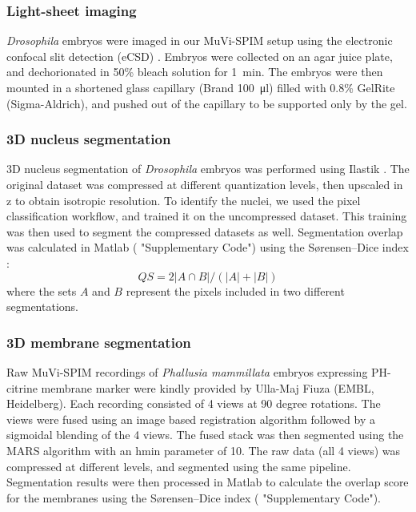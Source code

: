 \subsubsection{Light-sheet imaging}
\textit{Drosophila} embryos were imaged in our MuVi-SPIM setup \cite{krzic_multiview_2012} using the electronic confocal slit detection (eCSD) \cite{de_medeiros_confocal_2015}. Embryos were collected on an agar juice plate, and dechorionated in 50\% bleach solution for \SI{1}{min}. The embryos were then mounted in a shortened glass capillary (Brand \SI{100}{\micro l}) filled with 0.8\% GelRite (Sigma-Aldrich), and pushed out of the capillary to be supported only by the gel.

\subsubsection{3D nucleus segmentation}
3D nucleus segmentation of \textit{Drosophila} embryos was performed using Ilastik \cite{sommer_ilastik:_2011}. The original dataset was compressed at different quantization levels, then upscaled in z to obtain isotropic resolution. To identify the nuclei, we used the pixel classification workflow, and trained it on the uncompressed dataset. This training was then used to segment the compressed datasets as well. Segmentation overlap was calculated in Matlab ( "Supplementary Code") using the Sørensen–Dice index \cite{sorensen_method_1948,dice_measures_1945}:
\begin{equation}
  QS = 2 \left| A \cap B \right| / \left( |A| + |B| \right)
\end{equation}
where the sets $A$ and $B$ represent the pixels included in two different segmentations.

\subsubsection{3D membrane segmentation}
Raw MuVi-SPIM recordings of \textit{Phallusia mammillata} embryos expressing PH-citrine membrane marker were kindly provided by Ulla-Maj Fiuza (EMBL, Heidelberg). Each recording consisted of 4 views at 90 degree rotations. The views were fused using an image based registration algorithm followed by a sigmoidal blending of the 4 views. The fused stack was then segmented using the MARS algorithm \cite{fernandez_imaging_2010} with an hmin parameter of 10. The raw data (all 4 views) was compressed at different levels, and segmented using the same pipeline. Segmentation results were then processed in Matlab to calculate the overlap score for the membranes using the Sørensen–Dice index ( "Supplementary Code").

